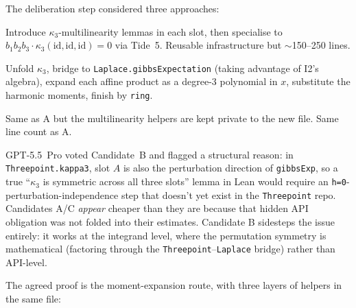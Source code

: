 \documentclass[11pt]{article}
\begin{document}
The deliberation step considered three approaches:
\begin{description}[leftmargin=2em]
\item[Candidate~A (multilinearity reduction).] Introduce
$\kappa_3$-multilinearity lemmas in each slot, then specialise to
$b_1 b_2 b_3 \cdot \kappa_3(\mathrm{id}, \mathrm{id}, \mathrm{id}) = 0$
via Tide~5. Reusable infrastructure but $\sim$150--250 lines.

\item[Candidate~B (direct moment expansion).] Unfold $\kappa_3$,
bridge to \texttt{Laplace.gibbsExpectation} (taking advantage of I2's
algebra), expand each affine product as a degree-3 polynomial in
$x$, substitute the harmonic moments, finish by \texttt{ring}.

\item[Candidate~C (private multilinearity).] Same as A but the
multilinearity helpers are kept private to the new file. Same line
count as A.
\end{description}

\noindent
GPT-5.5~Pro voted Candidate~B and flagged a structural reason: in
\texttt{Threepoint.kappa3}, slot $A$ is also the perturbation
direction of \texttt{gibbsExp}, so a true ``$\kappa_3$ is symmetric
across all three slots'' lemma in Lean would require an
\texttt{h=0}-perturbation-independence step that doesn't yet exist
in the \texttt{Threepoint} repo. Candidates A/C
\emph{appear} cheaper than they are because that hidden API
obligation was not folded into their estimates. Candidate B sidesteps
the issue entirely: it works at the integrand level, where the
permutation symmetry is mathematical (factoring through the
\texttt{Threepoint}--\texttt{Laplace} bridge) rather than API-level.

The agreed proof is the moment-expansion route, with three layers of
helpers in the same file:
\end{document}
